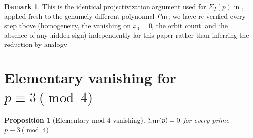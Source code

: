 \documentclass[11pt]{amsart}
\newtheorem{proposition}[theorem]{Proposition}
\theoremstyle{definition}
\newtheorem{remark}[theorem]{Remark}
\begin{document}
\begin{remark}
This is the identical projectivization argument used for $\Sigma_I(p)$ in
\cite{ClassesI_II}, applied fresh to the genuinely different polynomial
$P_{\rm III}$; we have re-verified every step above (homogeneity, the
vanishing on $x_0=0$, the orbit count, and the absence of any hidden
sign) independently for this paper rather than inferring the reduction
by analogy.
\end{remark}

\section{Elementary vanishing for $p\equiv3\pmod4$}
\label{sec:involution}

\begin{proposition}[Elementary mod-$4$ vanishing]
\label{prop:involution}
$\Sigma_{\rm III}(p)=0$ for every prime $p\equiv3\pmod4$.
\end{proposition}
\end{document}
